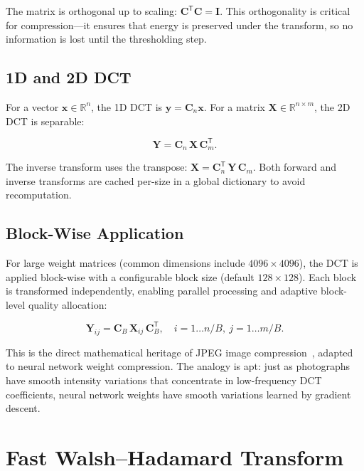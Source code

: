\documentclass[11pt,a4paper,openright]{book}
\begin{document}
The matrix is orthogonal up to scaling: $\mathbf{C}^\mathsf{T}\mathbf{C} = \mathbf{I}$. This orthogonality is critical for compression---it ensures that energy is preserved under the transform, so no information is lost until the thresholding step.

\subsection{1D and 2D DCT}

For a vector $\mathbf{x} \in \mathbb{R}^n$, the 1D DCT is $\mathbf{y} = \mathbf{C}_n \mathbf{x}$. For a matrix $\mathbf{X} \in \mathbb{R}^{n \times m}$, the 2D DCT is separable:

\begin{equation}
	\label{eq:dct2d}
	\mathbf{Y} = \mathbf{C}_n \, \mathbf{X} \, \mathbf{C}_m^\mathsf{T}.
\end{equation}

The inverse transform uses the transpose: $\mathbf{X} = \mathbf{C}_n^\mathsf{T} \, \mathbf{Y} \, \mathbf{C}_m$. Both forward and inverse transforms are cached per-size in a global dictionary to avoid recomputation.

\subsection{Block-Wise Application}

For large weight matrices (common dimensions include $4096 \times 4096$), the DCT is applied block-wise with a configurable block size (default $128 \times 128$). Each block is transformed independently, enabling parallel processing and adaptive block-level quality allocation:

\begin{equation}
	\label{eq:block_dct}
	\mathbf{Y}_{ij} = \mathbf{C}_B \, \mathbf{X}_{ij} \, \mathbf{C}_B^\mathsf{T}, \quad i=1\ldots n/B,\ j=1\ldots m/B.
\end{equation}

This is the direct mathematical heritage of JPEG image compression~\cite{ahmed1974dct}, adapted to neural network weight compression. The analogy is apt: just as photographs have smooth intensity variations that concentrate in low-frequency DCT coefficients, neural network weights have smooth variations learned by gradient descent.

\section{Fast Walsh--Hadamard Transform}
\end{document}
